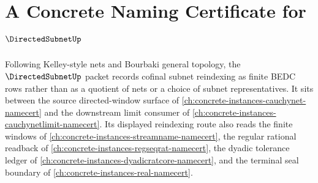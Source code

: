 \chapter{A Concrete Naming Certificate for $\DirectedSubnetUp$}
\label{ch:concrete-instances-directedsubnet-namecert}

Following Kelley-style nets and Bourbaki general topology, the $\DirectedSubnetUp$ packet records cofinal subnet reindexing as finite BEDC rows rather than as a quotient of nets or a choice of subnet representatives. It sits between the source directed-window surface of \autoref{ch:concrete-instances-cauchynet-namecert} and the downstream limit consumer of \autoref{ch:concrete-instances-cauchynetlimit-namecert}. Its displayed reindexing route also reads the finite windows of \autoref{ch:concrete-instances-streamname-namecert}, the regular rational readback of \autoref{ch:concrete-instances-regseqrat-namecert}, the dyadic tolerance ledger of \autoref{ch:concrete-instances-dyadicratcore-namecert}, and the terminal seal boundary of \autoref{ch:concrete-instances-real-namecert}.

